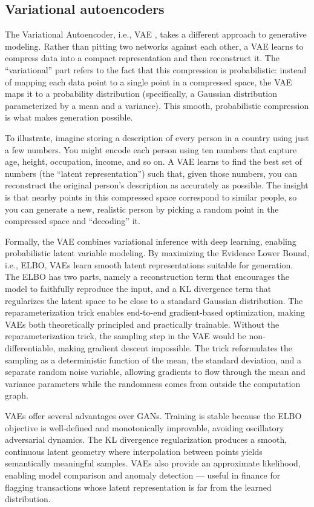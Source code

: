 \subsection{Variational autoencoders}

The Variational Autoencoder, i.e., VAE \cite{kingma2014vae}, takes a different approach to generative modeling. Rather than pitting two networks against each other, a VAE learns to compress data into a compact representation and then reconstruct it. The ``variational'' part refers to the fact that this compression is probabilistic: instead of mapping each data point to a single point in a compressed space, the VAE maps it to a probability distribution (specifically, a Gaussian distribution parameterized by a mean and a variance). This smooth, probabilistic compression is what makes generation possible.

To illustrate, imagine storing a description of every person in a country using just a few numbers. You might encode each person using ten numbers that capture age, height, occupation, income, and so on. A VAE learns to find the best set of numbers (the ``latent representation'') such that, given those numbers, you can reconstruct the original person's description as accurately as possible. The insight is that nearby points in this compressed space correspond to similar people, so you can generate a new, realistic person by picking a random point in the compressed space and ``decoding'' it.

Formally, the VAE combines variational inference with deep learning, enabling probabilistic latent variable modeling. By maximizing the Evidence Lower Bound, i.e., ELBO, VAEs learn smooth latent representations suitable for generation. The ELBO has two parts, namely a reconstruction term that encourages the model to faithfully reproduce the input, and a KL divergence term that regularizes the latent space to be close to a standard Gaussian distribution. The reparameterization trick enables end-to-end gradient-based optimization, making VAEs both theoretically principled and practically trainable. Without the reparameterization trick, the sampling step in the VAE would be non-differentiable, making gradient descent impossible. The trick reformulates the sampling as a deterministic function of the mean, the standard deviation, and a separate random noise variable, allowing gradients to flow through the mean and variance parameters while the randomness comes from outside the computation graph.

VAEs offer several advantages over GANs. Training is stable because the ELBO objective is well-defined and monotonically improvable, avoiding oscillatory adversarial dynamics. The KL divergence regularization produces a smooth, continuous latent geometry where interpolation between points yields semantically meaningful samples. VAEs also provide an approximate likelihood, enabling model comparison and anomaly detection — useful in finance for flagging transactions whose latent representation is far from the learned distribution.

